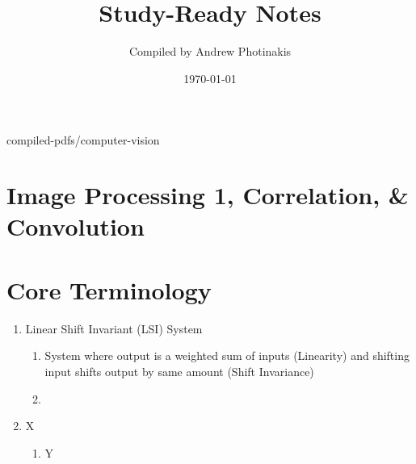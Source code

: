 \documentclass[12pt]{article}
\title{\TOPICTITLE\\\large Study-Ready Notes}
\author{Compiled by Andrew Photinakis}
\date{\today}
\begin{document}
\maketitle
\tableofcontents
\newpage
compiled-pdfs/computer-vision
\section*{Image Processing 1, Correlation, & Convolution}

\section{Core Terminology}

\begin{enumerate}
    \item Linear Shift Invariant (LSI) System
          \begin{enumerate}
              \item System where output is a weighted sum of inputs (Linearity) and shifting input shifts output by same amount (Shift Invariance)
              \item
          \end{enumerate}
    \item X
          \begin{enumerate}
              \item Y
          \end{enumerate}
\end{enumerate}
\end{document}
